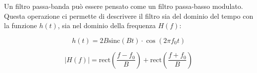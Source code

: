 Un filtro passa-banda può essere pensato come un filtro passa-basso modulato. Questa operazione ci permette di descrivere il filtro sia del dominio del tempo con la funzione $h(t)$, sia nel dominio della frequenza $H(f)$:

\begin{equation}
h(t) = 2B \text{sinc}(B t) \cdot \cos(2\pi f_0 t)
\end{equation}

\begin{equation}
|H(f)| = \text{rect}\left(\frac{f - f_0}{B}\right) + \text{rect}\left(\frac{f + f_0}{B}\right)
\end{equation}





